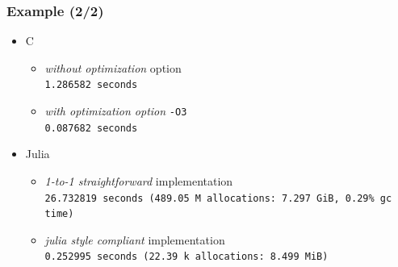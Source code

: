 \documentclass[]{beamer}
\newcommand*{\blue}[1]{\textcolor{nblue}{#1}}
\begin{document}
% 
%
\begin{frame}
  \frametitle{Example (2/2)}
\vspace{1mm}

\begin{itemize}
\item \blue{C}\\
\vspace{1mm}

\begin{itemize}
\item[] \hspace{-7.75mm}\textit{without optimization} option\\
{\scriptsize
\hspace{-7.5mm}\texttt{1.286582 seconds} %
}
\vspace{2mm}

\item[] \hspace{-8.2mm} \textit{with optimization option } \texttt{-O3}\\
{\scriptsize
\hspace{-7.5mm}\texttt{0.087682 seconds} %
}
\end{itemize}
\pause

\vspace{3mm}

\item \blue{Julia}\\
\vspace{1mm}

\begin{itemize}
\item[] \hspace{-7.75mm}\textit{1-to-1 straightforward} implementation\\
{\scriptsize
\hspace{-7.5mm}\texttt{26.732819 seconds (489.05 M allocations: 7.297 GiB, 0.29\% gc time)} %
}
\vspace{-2mm}\pause

\item[] \hspace{-7.95mm} \textit{julia style compliant} implementation\\
{\scriptsize
\hspace{-7.5mm}\texttt{0.252995 seconds (22.39 k allocations: 8.499 MiB)} %
}
\vspace{2mm}\pause


\end{itemize}
\end{itemize}
\end{frame}
\end{document}

